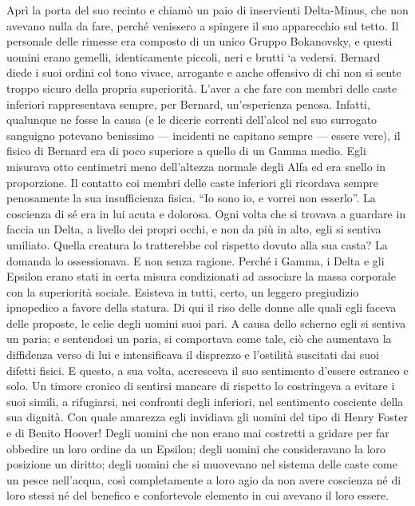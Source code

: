 \documentclass[
a5paper, %
10pt, %
twoside, 
onecolumn, %
openany, %
]{memoir}
\begin{document}
Aprì la porta del suo recinto e chiamò un paio di inservienti Delta-Minus, che non avevano nulla da fare, perché venissero a spingere il suo apparecchio sul tetto. Il personale delle rimesse era composto di un unico Gruppo Bokanovsky, e questi uomini erano gemelli, identicamente piccoli, neri e brutti `a vedersi. Bernard diede i suoi ordini col tono vivace, arrogante e anche offensivo di chi non si sente troppo sicuro della propria superiorità. L’aver a che fare con membri delle caste inferiori rappresentava sempre, per Bernard, un’esperienza penosa. Infatti, qualunque ne fosse la causa (e le dicerie correnti dell’alcol nel suo surrogato sanguigno potevano benissimo — incidenti ne capitano sempre — essere vere), il fisico di Bernard era di poco superiore a quello di un Gamma medio. Egli misurava otto centimetri meno dell’altezza normale degli Alfa ed era snello in proporzione. Il contatto coi membri delle caste inferiori gli ricordava sempre penosamente la sua insufficienza fisica. “Io sono io, e vorrei non esserlo”. La coscienza di sé era in lui acuta e dolorosa. Ogni volta che si trovava a guardare in faccia un Delta, a livello dei propri occhi, e non da più in alto, egli si sentiva umiliato. Quella creatura lo tratterebbe col rispetto dovuto alla sua casta? La domanda lo ossessionava. E non senza ragione. Perché i Gamma, i Delta e gli Epsilon erano stati in certa misura condizionati ad associare la massa corporale con la superiorità sociale. Esisteva in tutti, certo, un leggero pregiudizio ipnopedico a favore della statura. Di qui il riso delle donne alle quali egli faceva delle proposte, le celie degli uomini suoi pari. A causa dello scherno egli si sentiva un paria; e sentendosi un paria, si comportava come tale, ciò che aumentava la diffidenza verso di lui e intensificava il disprezzo e l’ostilità suscitati dai suoi difetti fisici. E questo, a sua volta, accresceva il suo sentimento d’essere estraneo e solo. Un timore cronico di sentirsi mancare di rispetto lo costringeva a evitare i suoi simili, a rifugiarsi, nei confronti degli inferiori, nel sentimento cosciente della sua dignità. Con quale amarezza egli invidiava gli uomini del tipo di Henry Foster e di Benito Hoover! Degli uomini che non erano mai costretti a gridare per far obbedire un loro ordine da un Epsilon; degli uomini che consideravano la loro posizione un diritto; degli uomini che si muovevano nel sistema delle caste come un pesce nell’acqua, così completamente a loro agio da non avere coscienza né di loro stessi né del benefico e confortevole elemento in cui avevano il loro essere.
\end{document}
